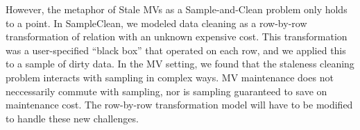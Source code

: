 However, the metaphor of Stale MVs as a Sample-and-Clean problem only holds to a point.
In SampleClean, we modeled data cleaning as a row-by-row transformation of relation with an unknown expensive cost. 
This transformation was a user-specified  ``black box'' that operated on each row, and we applied this to a sample of dirty data.
In the MV setting, we found that the staleness cleaning problem interacts with sampling in complex ways. 
MV maintenance does not neccessarily commute with sampling, nor is sampling guaranteed to save on maintenance cost.
The row-by-row transformation model will have to be modified to handle these new challenges. 

